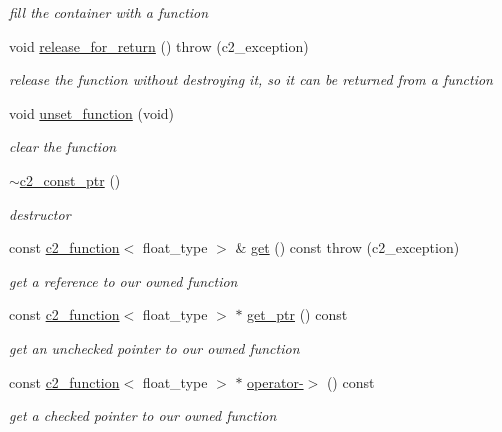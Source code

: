 \begin{DoxyCompactItemize}
\begin{DoxyCompactList}\small\item\em fill the container with a function \end{DoxyCompactList}\item 
void \hyperlink{classc2__const__ptr_a278e797ec2e770eaa80e84eb615819ac}{release\+\_\+for\+\_\+return} ()  throw (c2\+\_\+exception)
\begin{DoxyCompactList}\small\item\em release the function without destroying it, so it can be returned from a function \end{DoxyCompactList}\item 
void \hyperlink{classc2__const__ptr_aee1890c1f880174b9859d627d2c79425}{unset\+\_\+function} (void)
\begin{DoxyCompactList}\small\item\em clear the function \end{DoxyCompactList}\item 
\hyperlink{classc2__const__ptr_a13ec57f307039d21c12b20ab4aafda2f}{$\sim$c2\+\_\+const\+\_\+ptr} ()
\begin{DoxyCompactList}\small\item\em destructor \end{DoxyCompactList}\item 
const \hyperlink{classc2__function}{c2\+\_\+function}$<$ float\+\_\+type $>$ \& \hyperlink{classc2__const__ptr_a6d9dd4874c62d571d4d016f2de4a8aeb}{get} () const   throw (c2\+\_\+exception)
\begin{DoxyCompactList}\small\item\em get a reference to our owned function \end{DoxyCompactList}\item 
const \hyperlink{classc2__function}{c2\+\_\+function}$<$ float\+\_\+type $>$ $\ast$ \hyperlink{classc2__const__ptr_a63812c6959fbef01ade67dfeff760341}{get\+\_\+ptr} () const 
\begin{DoxyCompactList}\small\item\em get an unchecked pointer to our owned function \end{DoxyCompactList}\item 
const \hyperlink{classc2__function}{c2\+\_\+function}$<$ float\+\_\+type $>$ $\ast$ \hyperlink{classc2__const__ptr_a1a15e6786744bcebbe3bc8f0d53ad79d}{operator-\/$>$} () const 
\begin{DoxyCompactList}\small\item\em get a checked pointer to our owned function \end{DoxyCompactList}\item 

\end{DoxyCompactItemize}
